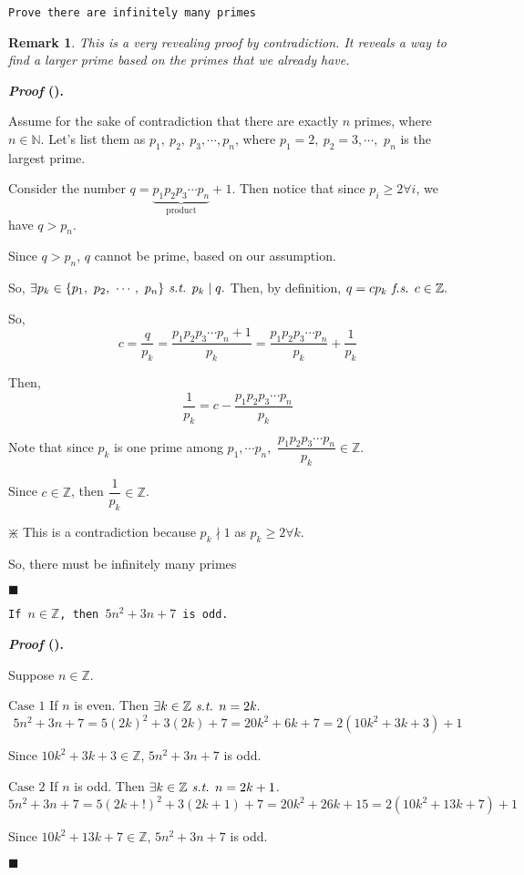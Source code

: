 \documentclass[12pt,a4paper]{article}
\newcounter{nprf}[subsection]
\newtheorem*{rmk}{\indent Remark}
\newenvironment*{prf}{\par\indent\textbf{\textit{Proof} (\stepcounter{nprf}\thenprf). }\par}{\par\hfill $\blacksquare$\par}
\def\Z{{\mathbb{Z}}}
\def\N{{\mathbb{N}}}
\def\st{\emph{ s.t. }}
\def\fs{\emph{ f.s. }}
\begin{document}
\begin{framed}
\noindent\texttt{Prove there are infinitely many primes}
\begin{rmk} This is a very revealing proof by contradiction. It reveals a way to find a larger prime based on the primes that we already have. \end{rmk}
\begin{prf}
	Assume for the sake of contradiction that there are exactly $n$ primes, where $n\in\N$. Let's list them as $p_1,\ p_2,\ p_3,\cdots,p_n$, where $p_1=2,\ p_2=3,\cdots,$ $p_n$ is the largest prime.\par Consider the number $q=\underbrace{p_1p_2p_3\cdots p_n}_{\text{product}}+1$. Then notice that since $p_i\geq2\forall i$, we have $q>p_n$.\par Since $q>p_n$, $q$ cannot be prime, based on our assumption.\par So, $\exists p_k\in\{p_1,\ p_2,\ \cdots,\ p_n\}\st p_k\mid q.$ Then, by definition, $q=cp_k\fs c\in\Z.$\par So, \[c=\frac{q}{p_k}=\frac{p_1p_2p_3\cdots p_n+1}{p_k}=\frac{p_1p_2p_3\cdots p_n}{p_k}+\frac{1}{p_k}\]\par Then, \[\frac{1}{p_k}=c-\frac{p_1p_2p_3\cdots p_n}{p_k}\]\par Note that since $p_k$ is one prime among $p_1,\cdots p_n,$ $\dfrac{p_1p_2p_3\cdots p_n}{p_k}\in\Z.$\par Since $c\in\Z$, then $\dfrac{1}{p_k}\in\Z$.\begin{center}$\divideontimes$ This is a contradiction because $p_k\nmid1$ as $p_k\geq2\forall k.$\end{center}\par So, there must be infinitely many primes
\end{prf}
\end{framed}
\begin{framed}
\noindent\texttt{If $n\in\Z$, then $5n^2+3n+7$ is odd.}
\begin{prf}
	Suppose $n\in\Z$.\par $\boxed{\text{Case }1}$ If $n$ is even. Then $\exists k\in\Z\st n=2k.$ \[5n^2+3n+7=5(2k)^2+3(2k)+7=20k^2+6k+7=2(10k^2+3k+3)+1\]\par\hspace{10mm}Since $10k^2+3k+3\in\Z$, $5n^2+3n+7$ is odd.\par $\boxed{\text{Case }2}$ If $n$ is odd. Then $\exists k\in\Z\st n=2k+1$.\[5n^2+3n+7=5(2k+!)^2+3(2k+1)+7=20k^2+26k+15=2(10k^2+13k+7)+1\]\par\hspace{10mm}Since $10k^2+13k+7\in\Z$, $5n^2+3n+7$ is odd.
\end{prf}
\end{framed}
\end{document}
